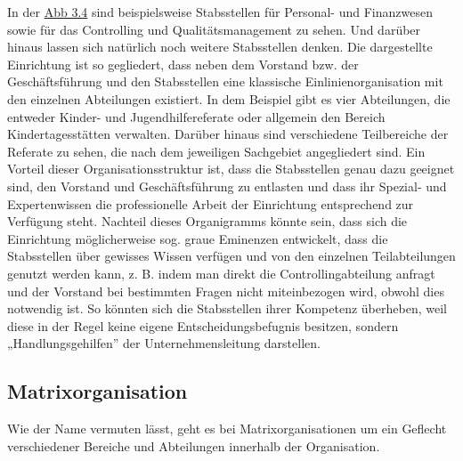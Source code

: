 \documentclass[
  letterpaper,
]{book}
\begin{document}
In der \hyperref[figure34]{Abb 3.4} sind beispielsweise Stabsstellen für
Personal- und Finanzwesen sowie für das Controlling und
Qualitätsmanagement zu sehen. Und darüber hinaus lassen sich natürlich
noch weitere Stabsstellen denken. Die dargestellte Einrichtung ist so
gegliedert, dass neben dem Vorstand bzw. der Geschäftsführung und den
Stabsstellen eine klassische Einlinienorganisation mit den einzelnen
Abteilungen existiert. In dem Beispiel gibt es vier Abteilungen, die
entweder Kinder- und Jugendhilfereferate oder allgemein den Bereich
Kindertagesstätten verwalten. Darüber hinaus sind verschiedene
Teilbereiche der Referate zu sehen, die nach dem jeweiligen Sachgebiet
angegliedert sind. Ein Vorteil dieser Organisationsstruktur ist, dass
die Stabsstellen genau dazu geeignet sind, den Vorstand und
Geschäftsführung zu entlasten und dass ihr Spezial- und Expertenwissen
die professionelle Arbeit der Einrichtung entsprechend zur Verfügung
steht. Nachteil dieses Organigramms könnte sein, dass sich die
Einrichtung möglicherweise sog. graue Eminenzen entwickelt, dass die
Stabsstellen über gewisses Wissen verfügen und von den einzelnen
Teilabteilungen genutzt werden kann, z. B. indem man direkt die
Controllingabteilung anfragt und der Vorstand bei bestimmten Fragen
nicht miteinbezogen wird, obwohl dies notwendig ist. So könnten sich die
Stabsstellen ihrer Kompetenz überheben, weil diese in der Regel keine
eigene Entscheidungsbefugnis besitzen, sondern „Handlungsgehilfen'' der
Unternehmensleitung darstellen.

\subsection{Matrixorganisation}\label{matrixorganisation}

Wie der Name vermuten lässt, geht es bei Matrixorganisationen um ein
Geflecht verschiedener Bereiche und Abteilungen innerhalb der
Organisation.
\end{document}
